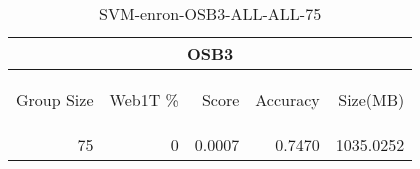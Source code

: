\begin{center}
\begin{table}[htbp] 
 \begin{center}
\begin{tabular}{ | r | r | r | r | r |}
\hline
\multicolumn{5}{|c|}{OSB3}\\
\hline
\begin{sideways}Group Size\end{sideways} & \begin{sideways}Web1T \%\end{sideways} & \begin{sideways}Score\end{sideways} & \begin{sideways}Accuracy\end{sideways} & \begin{sideways}Size(MB)\end{sideways}\\
\hline
\multirow{0}{*}{75}
 & 0 & 0.0007 & 0.7470 & 1035.0252\\ \cline{2-5}
\hline
\end{tabular}
\caption{SVM-enron-OSB3-ALL-ALL-75}
\label{table:SVM-enron-OSB3-ALL-ALL-75}
\end{center}
 \end{table}
\end{center}


